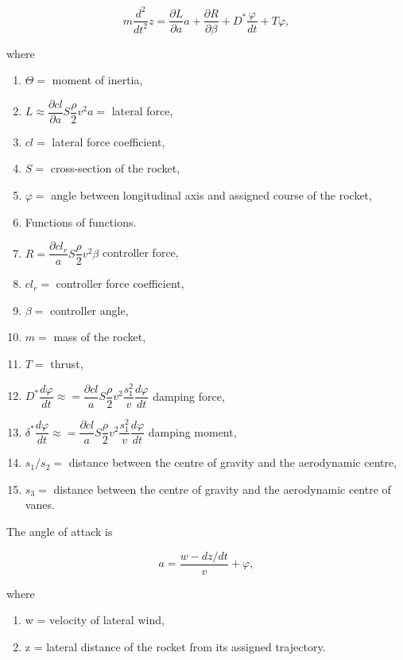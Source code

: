 \documentclass[12pt, a4paper]{article}
\begin{document}
\begin{equation}
  m\frac{d^{2}}{dt^{2}}z=\frac{\partial L}{\partial a}a+\frac{\partial R}{\partial\beta}+D^{*}\frac{\varphi}{dt}+T\varphi,
\end{equation}

where

\begin{enumerate}[label={}]
  \item $\Theta=$ moment of inertia,
  \item $L\approx\dfrac{\partial cl}{\partial a}S\dfrac{\rho}{2}v^{2}a=$ lateral force,
  \item $cl=$ lateral force coefficient,
  \item $S=$ cross-section of the rocket,
  \item $\varphi=$ angle between longitudinal axis and assigned course of the rocket,
  \item Functions of functions.

  \item $R=\dfrac{\partial cl_{r}}{a}S\dfrac{\rho}{2}v^{2}\beta$ controller force,
  \item $cl_{r}=$ controller force coefficient,
  \item $\beta=$ controller angle,
  \item $m=$ mass of the rocket,
  \item $T=$ thrust,
  \item $D^{*}\dfrac{d\varphi}{dt}\approx=\dfrac{\partial cl}{a}S\dfrac{\rho}{2}v^{2}\dfrac{s^{2}_{1}}{v}\dfrac{d\varphi}{dt}$ damping force,
  \item $\delta^{*}\dfrac{d\varphi}{dt}\approx=\dfrac{\partial cl}{a}S\dfrac{\rho}{2}v^{2}\dfrac{s^{2}_{1}}{v}\dfrac{d\varphi}{dt}$ damping moment,
  \item $s_{1}/s_{2}=$ distance between the centre of gravity and the aerodynamic centre,
  \item $s_{3}=$ distance between the centre of gravity and the aerodynamic centre of vanes.
\end{enumerate}

The angle of attack is

\begin{equation}
  a=\dfrac{w-dz/dt}{v}+\varphi,
\end{equation}

where

\begin{enumerate}[label={}]
  \item w = velocity of lateral wind,
  \item z = lateral distance of the rocket from its assigned trajectory.
\end{enumerate}
\end{document}
